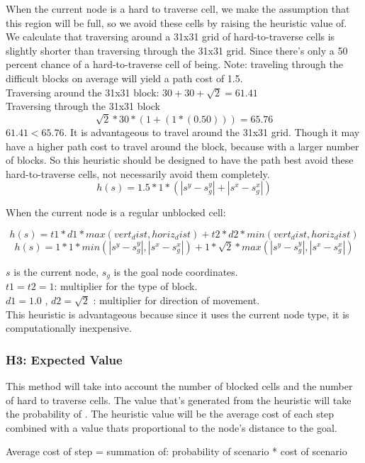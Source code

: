 When the current node is a hard to traverse cell, we make the assumption that this region will be full, so we avoid these cells by raising the heuristic value of.
We calculate that traversing around a 31x31 grid of hard-to-traverse cells is slightly shorter than traversing through the 31x31 grid. Since there's only a 50 percent chance of a hard-to-traverse cell of being. Note: traveling through the difficult blocks on average will yield a path cost of 1.5.
\\Traversing around the 31x31 block: $ 30 + 30 + \sqrt{2} = 61.41$
\\Traversing through the 31x31 block \[ \sqrt{2} * 30 * (1 + (1 * (0.50))) = 65.76\] 
$61.41 < 65.76$. It is advantageous to travel around the 31x31 grid.
Though it may have a higher path cost to travel around the block, because with a larger number of blocks.
So this heuristic should be designed to have the path best avoid these hard-to-traverse cells, not necessarily avoid them completely.
\[h(s) = 1.5 * 1 * ( |s^y - s_g^y| + |s^x - s_g^x| )\]

When the current node is a regular unblocked cell:

\[h(s) = t1 * d1  * max(vert_dist, horiz_dist) + t2 * d2 * min(vert_dist, horiz_dist)\]
\[h(s) = 1 * 1 *min(|s^y - s_g^y|, |s^x - s_g^x|) + 1 * \sqrt{2} * max(|s^y - s_g^y|, |s^x - s_g^x|)   \]

 $s$ is the current node, $s_g$ is the goal node coordinates. \\
 $t1 = t2 = 1$: multiplier for the type of block. \\
 $d1 = 1.0$ , $d2 = \sqrt{2}$ : multiplier for direction of movement. \\

This heuristic is advantageous because since it uses the current node type, it is computationally inexpensive. 

\subsubsection{H3: Expected Value}
This method will take into account the number of blocked cells and the number of hard to traverse cells. The value that's generated from the heuristic will take the probability of . The heuristic value will be the average cost of each step combined with a value thats proportional to the node's distance to the goal.

Average cost of step = summation of: probability of scenario * cost of scenario

